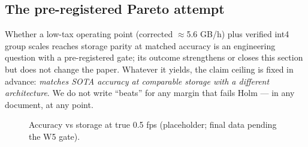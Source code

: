 \subsection{The pre-registered Pareto attempt}
Whether a low-tax operating point (corrected $\approx$5.6 GB/h) plus verified int4 group scales reaches storage parity at matched accuracy is an engineering question with a pre-registered gate; its outcome strengthens or closes this section but does not change the paper. Whatever it yields, the claim ceiling is fixed in advance: \emph{matches SOTA accuracy at comparable storage with a different architecture}. We do not write ``beats'' for any margin that fails Holm — in any document, at any point.

\begin{figure}[t]
\centering
{}
\caption{Accuracy vs storage at true 0.5 fps (placeholder; final data pending the W5 gate).}
\label{fig:pareto}
\end{figure}
